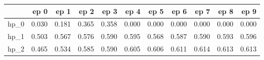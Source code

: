 \begin{tabular}{lrrrrrrrrrr}
\toprule
{} &   ep 0 &   ep 1 &   ep 2 &   ep 3 &   ep 4 &   ep 5 &   ep 6 &   ep 7 &   ep 8 &   ep 9 \\
\midrule
hp\_0 &  0.030 &  0.181 &  0.365 &  0.358 &  0.000 &  0.000 &  0.000 &  0.000 &  0.000 &  0.000 \\
hp\_1 &  0.503 &  0.567 &  0.576 &  0.590 &  0.595 &  0.568 &  0.587 &  0.590 &  0.593 &  0.596 \\
hp\_2 &  0.465 &  0.534 &  0.585 &  0.590 &  0.605 &  0.606 &  0.611 &  0.614 &  0.613 &  0.613 \\
\bottomrule
\end{tabular}
